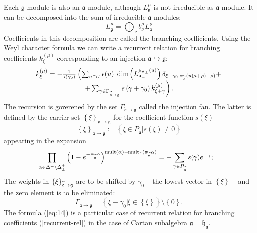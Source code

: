 \documentclass[preprint,12pt]{elsarticle}
\newcommand{\gf}{\mathfrak{g}}
\newcommand{\af}{\mathfrak{a}}
\newcommand{\afb}{\mathfrak{a}_{\bot}}
\newcommand{\hf}{\mathfrak{h}}
\newcommand{\hfg}{\hf_{\gf}}
\begin{document}
Each $\gf$-module is also an $\af$-module, although
$L^{\mu}_{\gf}$ is not irreducible as $\af$-module. It can be
decomposed into the sum of irreducible $\af$-modules:
\begin{equation}
  \label{eq:16}
  L^{\mu}_{\gf}=\bigoplus_{\nu}b^{\mu}_{\nu}L^{\nu}_{\af}
\end{equation}
Coefficients in this decomposition are called the branching
coefficients. Using the Weyl character formula we can write a
recurrent relation \cite{2010arXiv1007.0318L} for branching
coefficients $k_{\xi }^{\left( \mu \right) }$ corresponding to an
injection $\af\hookrightarrow \gf$:
\begin{equation}
\begin{array}{c}
k_{\xi }^{\left( \mu \right) }=-\frac{1}{s\left( \gamma _{0}\right) }\left(
\sum_{u\in U}\epsilon (u)\;\dim \left( L_{\afb}^{\mu _{\af%
_{\perp }}\left( u\right) }\right) \delta _{\xi -\gamma _{0},\pi _{%
\widetilde{\af}}(u(\mu +\rho )-\rho )}+\right.  \\
\left. +\sum_{\gamma \in \Gamma _{\widetilde{\af}\rightarrow \gf%
}}s\left( \gamma +\gamma _{0}\right) k_{\xi +\gamma }^{\left( \mu \right)
}\right) .
\end{array}
\label{recurrent-rel}
\end{equation}
The recursion is goverened by the set $\Gamma _{\widetilde{\af}\rightarrow \gf}$ called the injection fan. The latter is defined by the
carrier set $\left\{ \xi \right\} _{\af\rightarrow \gf}$ for the
coefficient function $s(\xi )$
\begin{equation*}
\left\{ \xi \right\} _{\widetilde{\af}\rightarrow \gf}:=\left\{
\xi \in P_{\widetilde{\af}}|s(\xi )\neq 0\right\}
\end{equation*}
appearing in the expansion
\begin{equation}
\prod_{\alpha \in \Delta ^{+}\setminus \Delta _{\bot }^{+}}\left( 1-e^{-\pi
_{\widetilde{\af}}\alpha }\right) ^{\mathrm{mult}(\alpha )-\mathrm{mult}%
_{\af}(\pi _{\widetilde{\af}}\alpha )}=-\sum_{\gamma \in P_{%
\widetilde{\af}}}s(\gamma )e^{-\gamma };\quad
\end{equation}
The weights in $\left\{ \xi \right\} _{\widetilde{\af}\rightarrow \frak{%
g}}$ are to be shifted by $\gamma _{0}$ -- the lowest vector in $\left\{ \xi
\right\} $ -- and the zero element is to be eliminated:
\begin{equation}
\Gamma _{\widetilde{\af}\rightarrow \gf}=\left\{ \xi -\gamma
_{0}|\xi \in \left\{ \xi \right\} \right\} \setminus \left\{ 0\right\} .
\end{equation}
The formula (\ref{eq:14}) is a particular case of recurrent relation for branching coefficients (\ref{recurrent-rel}) in the case of Cartan subalgebra $\af=\hfg$.
\end{document}
